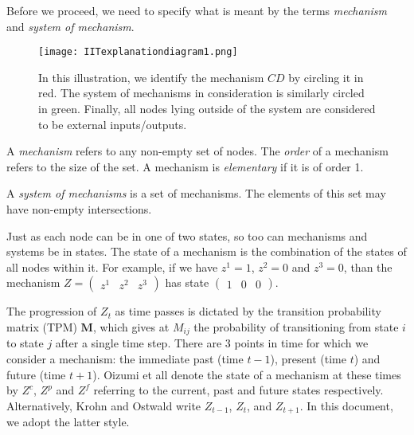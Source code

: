 Before we proceed, we need to specify what is meant by the terms \textit{mechanism} and \textit{system of mechanism}.

\begin{figure}[ht]
	\centering
	
	\texttt{[image: IITexplanationdiagram1.png]}
	\caption{In this illustration, we identify the mechanism $CD$ by circling it in red. The system of mechanisms in consideration is similarly circled in green. Finally, all nodes lying outside of the system are considered to be external inputs/outputs.}
	\label{fig:IIT_illustration1}
\end{figure}


\begin{definition}{A \textit{mechanism} refers to any non-empty set of nodes. The \textit{order} of a mechanism refers to the size of the set. A mechanism is \textit{elementary} if it is of order 1.}
\end{definition}

\begin{definition}{A \textit{system of mechanisms} is a set of mechanisms. The elements of this set may have non-empty intersections.}
\end{definition}


Just as each node can be in one of two states, so too can mechanisms and systems be in states. The state of a mechanism is the combination of the states of all nodes within it. For example, if we have $z^1=1$, $z^2=0$ and $z^3=0$, than the mechanism $Z = \left(\begin{array}{ccc}z^1&z^2&z^3\end{array}\right)$ has state $\left(\begin{array}{ccc}1&0&0\end{array}\right)$. 


The progression of $Z_t$ as time passes is dictated by the transition probability matrix (TPM) $\mathbf{M}$, which gives at $M_{ij}$ the probability of transitioning from state $i$ to state $j$ after a single time step. There are 3 points in time for which we consider a mechanism: the immediate past (time $t-1$), present (time $t$) and future (time $t+1$). Oizumi et all \cite{oizumi2014phenomenology} denote the state of a mechanism at these times by $Z^c$, $Z^p$ and $Z^f$ referring to the current, past and future states respectively. Alternatively, Krohn and Ostwald \cite{krohn2016computing} write $Z_{t-1}$, $Z_{t}$, and $Z_{t+1}$. In this document, we adopt the latter style.



